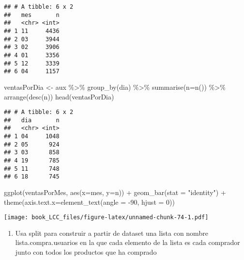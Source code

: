 \documentclass[
]{book}
\newenvironment{Shaded}{\begin{snugshade}}{\end{snugshade}}
\newcommand{\AttributeTok}[1]{\textcolor[rgb]{0.77,0.63,0.00}{#1}}
\newcommand{\DecValTok}[1]{\textcolor[rgb]{0.00,0.00,0.81}{#1}}
\newcommand{\FunctionTok}[1]{\textcolor[rgb]{0.00,0.00,0.00}{#1}}
\newcommand{\NormalTok}[1]{#1}
\newcommand{\OtherTok}[1]{\textcolor[rgb]{0.56,0.35,0.01}{#1}}
\newcommand{\SpecialCharTok}[1]{\textcolor[rgb]{0.00,0.00,0.00}{#1}}
\newcommand{\StringTok}[1]{\textcolor[rgb]{0.31,0.60,0.02}{#1}}
\providecommand{\tightlist}{%
  \setlength{\itemsep}{0pt}\setlength{\parskip}{0pt}}
\begin{document}
\begin{verbatim}
## # A tibble: 6 x 2
##   mes       n
##   <chr> <int>
## 1 11     4436
## 2 03     3944
## 3 02     3906
## 4 01     3356
## 5 12     3339
## 6 04     1157
\end{verbatim}

\begin{Shaded}
\begin{Highlighting}[]
\NormalTok{ventasPorDia }\OtherTok{\textless{}{-}}\NormalTok{  aux }\SpecialCharTok{\%\textgreater{}\%} 
  \FunctionTok{group\_by}\NormalTok{(dia) }\SpecialCharTok{\%\textgreater{}\%}
  \FunctionTok{summarise}\NormalTok{(}\AttributeTok{n=}\FunctionTok{n}\NormalTok{()) }\SpecialCharTok{\%\textgreater{}\%}
  \FunctionTok{arrange}\NormalTok{(}\FunctionTok{desc}\NormalTok{(n))}
\FunctionTok{head}\NormalTok{(ventasPorDia)}
\end{Highlighting}
\end{Shaded}

\begin{verbatim}
## # A tibble: 6 x 2
##   dia       n
##   <chr> <int>
## 1 04     1048
## 2 05      924
## 3 03      858
## 4 19      785
## 5 11      748
## 6 18      745
\end{verbatim}

\begin{Shaded}
\begin{Highlighting}[]
\FunctionTok{ggplot}\NormalTok{(ventasPorMes, }\FunctionTok{aes}\NormalTok{(}\AttributeTok{x=}\NormalTok{mes, }\AttributeTok{y=}\NormalTok{n)) }\SpecialCharTok{+}
\FunctionTok{geom\_bar}\NormalTok{(}\AttributeTok{stat =} \StringTok{"identity"}\NormalTok{) }\SpecialCharTok{+} \FunctionTok{theme}\NormalTok{(}\AttributeTok{axis.text.x=}\FunctionTok{element\_text}\NormalTok{(}\AttributeTok{angle =} \SpecialCharTok{{-}}\DecValTok{90}\NormalTok{, }\AttributeTok{hjust =} \DecValTok{0}\NormalTok{))}
\end{Highlighting}
\end{Shaded}

\texttt{[image: book\_LCC\_files/figure-latex/unnamed-chunk-74-1.pdf]}

\begin{enumerate}
\def\labelenumi{\arabic{enumi}.}
\setcounter{enumi}{13}
\tightlist
\item
  Usa split para construir a partir de dataset una lista con nombre lista.compra.usuarios en la que cada elemento de la lista es cada comprador junto con todos los productos que ha comprado
\end{enumerate}
\end{document}
